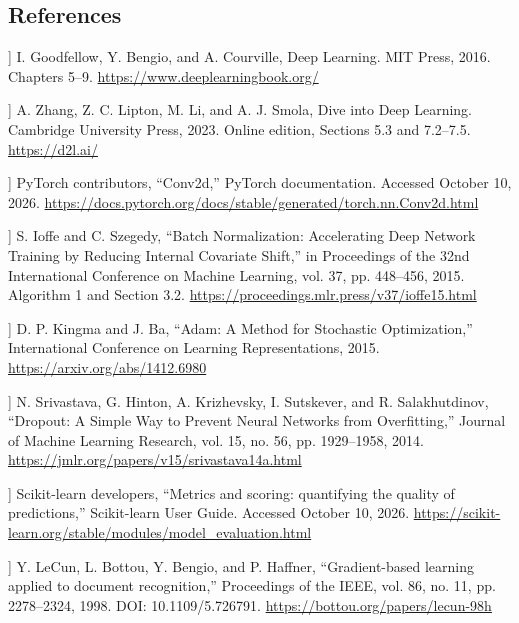 \subsection*{References}
\begin{list}{}{\setlength{\leftmargin}{2.5em}\setlength{\labelwidth}{2em}\setlength{\labelsep}{0.5em}\setlength{\itemsep}{0.5em}}

\item[[1]] I. Goodfellow, Y. Bengio, and A. Courville, Deep Learning. MIT Press, 2016. Chapters 5--9.
\url{https://www.deeplearningbook.org/}

\item[[2]] A. Zhang, Z. C. Lipton, M. Li, and A. J. Smola, Dive into Deep Learning. Cambridge University Press, 2023. Online edition, Sections 5.3 and 7.2--7.5.
\url{https://d2l.ai/}

\item[[3]] PyTorch contributors, ``Conv2d,'' PyTorch documentation. Accessed October 10, 2026.
\url{https://docs.pytorch.org/docs/stable/generated/torch.nn.Conv2d.html}

\item[[4]] S. Ioffe and C. Szegedy, ``Batch Normalization: Accelerating Deep Network Training by Reducing Internal Covariate Shift,'' in Proceedings of the 32nd International Conference on Machine Learning, vol. 37, pp. 448--456, 2015. Algorithm 1 and Section 3.2.
\url{https://proceedings.mlr.press/v37/ioffe15.html}

\item[[5]] D. P. Kingma and J. Ba, ``Adam: A Method for Stochastic Optimization,'' International Conference on Learning Representations, 2015.
\url{https://arxiv.org/abs/1412.6980}

\item[[6]] N. Srivastava, G. Hinton, A. Krizhevsky, I. Sutskever, and R. Salakhutdinov, ``Dropout: A Simple Way to Prevent Neural Networks from Overfitting,'' Journal of Machine Learning Research, vol. 15, no. 56, pp. 1929--1958, 2014.
\url{https://jmlr.org/papers/v15/srivastava14a.html}

\item[[7]] Scikit-learn developers, ``Metrics and scoring: quantifying the quality of predictions,'' Scikit-learn User Guide. Accessed October 10, 2026.
\url{https://scikit-learn.org/stable/modules/model_evaluation.html}

\item[[8]] Y. LeCun, L. Bottou, Y. Bengio, and P. Haffner, ``Gradient-based learning applied to document recognition,'' Proceedings of the IEEE, vol. 86, no. 11, pp. 2278--2324, 1998. DOI: 10.1109/5.726791.
\url{https://bottou.org/papers/lecun-98h}


\end{list}
